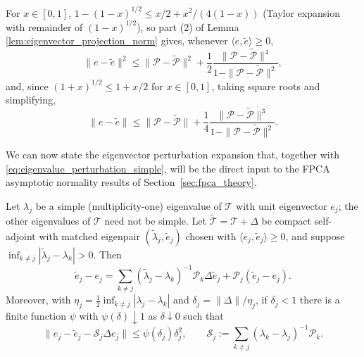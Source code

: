 For $x\in[0,1]$, $1-(1-x)^{1/2}\leq x/2+x^2/(4(1-x))$ (Taylor expansion
with remainder of $(1-x)^{1/2}$), so part (2) of Lemma
\ref{lem:eigenvector_projection_norm} gives, whenever $\langle e,
\widetilde{e}\rangle\geq 0$,
\begin{equation}
\|e-\widetilde{e}\|^2 \leq \|\mathcal{P}-\widetilde{\mathcal{P}}\|^2 +
\frac{1}{2}\frac{\|\mathcal{P}-\widetilde{\mathcal{P}}\|^4}{1-\|\mathcal{P}
-\widetilde{\mathcal{P}}\|^2},
\label{eq:eigenvector_norm_sq_bound}
\end{equation}
and, since $(1+x)^{1/2}\leq 1+x/2$ for $x\in[0,1]$, taking square roots and
simplifying,
\begin{equation}
\|e-\widetilde{e}\| \leq \|\mathcal{P}-\widetilde{\mathcal{P}}\| +
\frac{1}{4}\frac{\|\mathcal{P}-\widetilde{\mathcal{P}}\|^3}{1-\|\mathcal{P}
-\widetilde{\mathcal{P}}\|^2}.
\label{eq:eigenvector_norm_bound}
\end{equation}

We can now state the eigenvector perturbation expansion that, together
with \eqref{eq:eigenvalue_perturbation_simple}, will be the direct input to
the FPCA asymptotic normality results of Section~\ref{sec:fpca_theory}.

\begin{theorem}
\label{thm:eigenvector_perturbation}
Let $\lambda_j$ be a simple (multiplicity-one) eigenvalue of $\mathcal{T}$
with unit eigenvector $e_j$; the other eigenvalues of $\mathcal{T}$ need
not be simple. Let $\widetilde{\mathcal{T}}=\mathcal{T}+\Delta$ be compact
self-adjoint with matched eigenpair $(\widetilde\lambda_j,\widetilde{e}_j)$
chosen with $\langle e_j,\widetilde{e}_j\rangle\geq 0$, and suppose
$\inf_{k\neq j}|\widetilde\lambda_j-\lambda_k|>0$. Then
\begin{equation}
\widetilde{e}_j - e_j = \sum_{k\neq j}(\widetilde\lambda_j-\lambda_k)^{-1}
\mathcal{P}_k\Delta\widetilde{e}_j + \mathcal{P}_j(\widetilde{e}_j-e_j).
\label{eq:eigenvector_expansion}
\end{equation}
Moreover, with $\eta_j=\frac{1}{2}\inf_{k\neq j}|\lambda_j-\lambda_k|$ and
$\delta_j=\|\Delta\|/\eta_j$, if $\delta_j<1$ there is a finite function
$\psi$ with $\psi(\delta)\downarrow 1$ as $\delta\downarrow 0$ such that
\begin{equation}
\|e_j - \widetilde{e}_j - \mathcal{S}_j\Delta e_j\| \leq \psi(\delta_j)
\delta_j^2, \qquad \mathcal{S}_j := \sum_{k\neq j}(\lambda_k-\lambda_j)^{-1}
\mathcal{P}_k.
\label{eq:eigenvector_perturbation_bound}
\end{equation}
\end{theorem}

